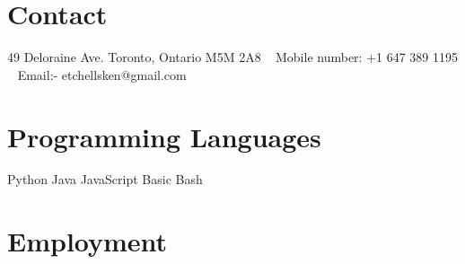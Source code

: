 \documentclass[]{cv-style}          %
\begin{document}


\begin{aside}
%
\section{Contact}
49 Deloraine Ave.
Toronto, Ontario
M5M 2A8
~
Mobile number:
+1 647 389 1195
~
Email:-
etchellsken@gmail.com
\section{Programming
   Languages}
Python
Java
JavaScript
Basic Bash
%
\end{aside}



\section{Employment}
\end{document}
